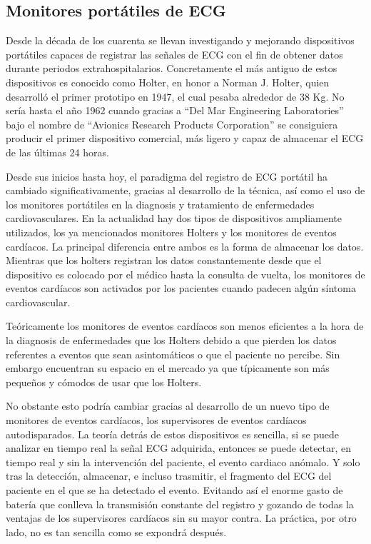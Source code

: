 \subsection{Monitores portátiles de ECG}

Desde la década de los cuarenta se llevan investigando y mejorando dispositivos portátiles capaces de registrar las señales de ECG con el fin de obtener datos durante periodos extrahospitalarios. Concretamente el más antiguo de estos dispositivos es conocido como Holter, en honor a Norman J. Holter, quien desarrolló el primer prototipo en 1947, el cual pesaba alrededor de 38 Kg. No sería hasta el año 1962 cuando gracias a “Del Mar Engineering Laboratories” bajo el nombre de “Avionics Research Products Corporation” se consiguiera producir el primer dispositivo comercial, más ligero y capaz de almacenar el ECG de las últimas 24 horas. \cite{NormanHolter}

Desde sus inicios hasta hoy, el paradigma del registro de ECG portátil ha cambiado significativamente, gracias al desarrollo de la técnica, así como el uso de los monitores portátiles en la diagnosis y tratamiento de enfermedades cardiovasculares. En la actualidad hay dos tipos de dispositivos ampliamente utilizados, los ya mencionados monitores Holters y los monitores de eventos cardíacos. La principal diferencia entre ambos es la forma de almacenar los datos. Mientras que los holters registran los datos constantemente desde que el dispositivo es colocado por el médico hasta la consulta de vuelta, los monitores de eventos cardíacos son activados por los pacientes cuando padecen algún síntoma cardiovascular.

Teóricamente los monitores de eventos cardíacos son menos eficientes a la hora de la diagnosis de enfermedades que los Holters debido a que pierden los datos referentes a eventos que sean asintomáticos o que el paciente no percibe. Sin embargo encuentran su espacio en el mercado ya que típicamente son más pequeños y cómodos de usar que los Holters.

No obstante esto podría cambiar gracias al desarrollo de un nuevo tipo de monitores de eventos cardíacos, los supervisores de eventos cardíacos autodisparados. La teoría detrás de estos dispositivos es sencilla, si se puede analizar en tiempo real la señal ECG adquirida, entonces se puede detectar, en tiempo real y sin la intervención del paciente, el evento cardiaco anómalo. Y solo tras la detección, almacenar, e incluso trasmitir, el fragmento del ECG del paciente en el que se ha detectado el evento. Evitando así el enorme gasto de batería que conlleva la transmisión constante del registro y gozando de todas la ventajas de los supervisores cardíacos sin su mayor contra. La práctica, por otro lado, no es tan sencilla como se expondrá después.

